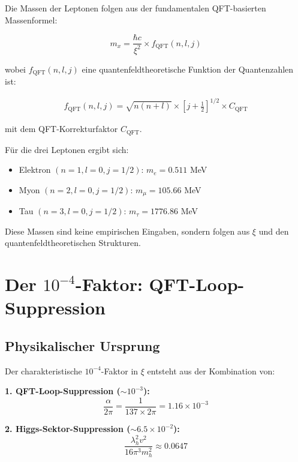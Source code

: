 \documentclass[12pt,a4paper]{article}
\begin{document}
	Die Massen der Leptonen folgen aus der fundamentalen QFT-basierten Massenformel:
	
	\begin{equation}
		m_x = \frac{\hbar c}{\xi^2} \times f_{\text{QFT}}(n, l, j)
	\end{equation}
	
	wobei $f_{\text{QFT}}(n, l, j)$ eine quantenfeldtheoretische Funktion der Quantenzahlen ist:
	
	\begin{align}
		f_{\text{QFT}}(n, l, j) = \sqrt{n(n+l)} \times \left[j + \frac{1}{2}\right]^{1/2} \times C_{\text{QFT}}
	\end{align}
	
	mit dem QFT-Korrekturfaktor $C_{\text{QFT}}$.
	
	Für die drei Leptonen ergibt sich:
	
	\begin{itemize}
		\item Elektron $(n=1, l=0, j=1/2)$: $m_e = 0.511$ MeV
		\item Myon $(n=2, l=0, j=1/2)$: $m_\mu = 105.66$ MeV
		\item Tau $(n=3, l=0, j=1/2)$: $m_\tau = 1776.86$ MeV
	\end{itemize}
	
	Diese Massen sind keine empirischen Eingaben, sondern folgen aus $\xi$ und den quantenfeldtheoretischen Strukturen.
	
	\section{Der $10^{-4}$-Faktor: QFT-Loop-Suppression}
	
	\subsection{Physikalischer Ursprung}
	
	Der charakteristische $10^{-4}$-Faktor in $\xi$ entsteht aus der Kombination von:
	
	\textbf{1. QFT-Loop-Suppression ($\sim 10^{-3}$):}
	\begin{equation}
		\frac{\alpha}{2\pi} = \frac{1}{137 \times 2\pi} = 1.16 \times 10^{-3}
	\end{equation}
	
	\textbf{2. Higgs-Sektor-Suppression ($\sim 6.5 \times 10^{-2}$):}
	\begin{equation}
		\frac{\lambda_h^2 v^2}{16\pi^3 m_h^2} \approx 0.0647
	\end{equation}
	
\end{document}
